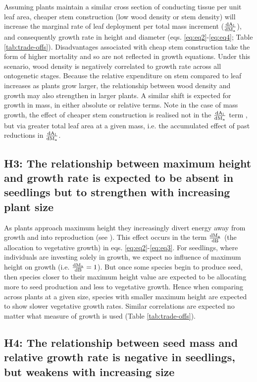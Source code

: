 \documentclass[a4paper,11pt]{article}
\begin{document}
Assuming plants maintain a similar cross section of conducting tissue per unit leaf area, cheaper stem construction (low wood density or stem density) will increase the marginal rate of leaf deployment per total mass increment ($\frac{\rm{d} A_{\rm l}}{\rm{d} M_{\rm a} }$), and consequently growth rate in height and diameter (eqs. \ref{eq:eq2}-\ref{eq:eq4}; Table \ref{tab:trade-offs}). Disadvantages associated with cheap stem construction take the form of higher mortality and so are not reflected in growth equations. Under this scenario, wood density is negatively correlated to growth rate across all ontogenetic stages. Because the relative expenditure on stem compared to leaf increases as plants grow larger, the relationship between wood density and growth may also strengthen in larger plants. A similar shift is expected for growth in mass, in either absolute or relative terms. Note in the case of mass growth, the effect of cheaper stem construction is realised not in the $\frac{\rm{d} A_{\rm l}}{\rm{d} M_{\rm a} }$ term , but via greater total leaf area at a given mass, i.e. the accumulated effect of past reductions in  $\frac{\rm{d} A_{\rm l}}{\rm{d} M_{\rm a} }$.

\subsection*{H3: The relationship between maximum height and growth rate is expected to be absent in seedlings but to strengthen with increasing plant size}

As plants approach maximum height they increasingly divert energy away from growth and into reproduction (see \citealt{Thomas:1996do,Thomas-2011, Wenk:2015jz}). This effect occurs in the term $\frac{\rm{d} M_{\rm a} }{\rm{d} B}$ (the allocation to vegetative growth) in eqs. \ref{eq:eq2}-\ref{eq:eq3}. For seedlings, where individuals are investing solely in growth, we expect no influence of maximum height on growth (i.e. $\frac{\rm{d} M_{\rm a} }{\rm{d} B} =1$). But once some species begin to produce seed, then species closer to their maximum height value are expected to be allocating more to seed production and less to vegetative growth. Hence when comparing across plants at a given size, species with smaller maximum height are expected to show slower vegetative growth rates. Similar correlations are expected no matter what measure of growth is used (Table \ref{tab:trade-offs}).

\subsection*{H4: The relationship between seed mass and relative growth rate is negative in seedlings, but weakens with increasing size}
\end{document}
